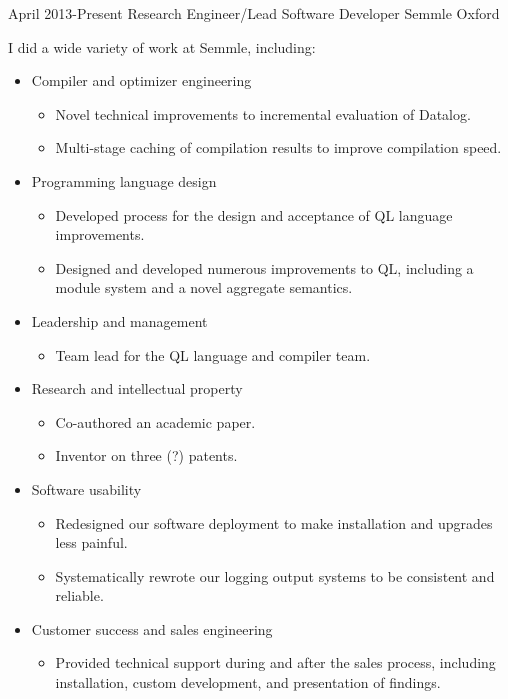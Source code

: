 \documentclass[12pt,a4paper,sans]{moderncv}
\begin{document}
\cventry
{April 2013-Present}
{Research Engineer/Lead Software Developer}
{Semmle}
{Oxford}
{}
{
  I did a wide variety of work at Semmle, including:
  \begin{itemize}
  \item Compiler and optimizer engineering
    \begin{itemize}
    \item Novel technical improvements to incremental evaluation of Datalog.
    \item Multi-stage caching of compilation results to improve compilation speed.
    \end{itemize}
  \item Programming language design
    \begin{itemize}
    \item Developed process for the design and acceptance of QL language improvements.
    \item Designed and developed numerous improvements to QL, including a module
      system and a novel aggregate semantics.
    \end{itemize}
  \item Leadership and management
    \begin{itemize}
    \item Team lead for the QL language and compiler team.
    \end{itemize}
  \item Research and intellectual property
    \begin{itemize}
    \item Co-authored an academic paper.
    \item Inventor on three (?) patents.
    \end{itemize}
  \item Software usability
    \begin{itemize}
    \item Redesigned our software deployment to make installation and
      upgrades less painful.
    \item Systematically rewrote our logging output systems to be consistent and reliable.
    \end{itemize}
  \item Customer success and sales engineering
    \begin{itemize}
    \item Provided technical support during and after the sales process, including
      installation, custom development, and presentation of findings.
    \end{itemize}
  \end{itemize}
}
\end{document}
